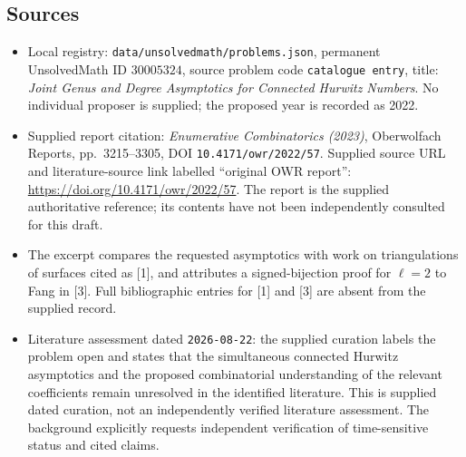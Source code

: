 \documentclass[11pt]{article}
\begin{document}
\subsection{Sources}
\begin{itemize}
\item Local registry: \texttt{data/unsolvedmath/problems.json}, permanent UnsolvedMath ID \(30005324\), source problem code \texttt{catalogue entry}, title: \emph{Joint Genus and Degree Asymptotics for Connected Hurwitz Numbers}. No individual proposer is supplied; the proposed year is recorded as 2022.
\item Supplied report citation: \emph{Enumerative Combinatorics (2023)}, Oberwolfach Reports, pp.\ 3215--3305, DOI \texttt{10.4171/owr/2022/57}. Supplied source URL and literature-source link labelled ``original OWR report'': \url{https://doi.org/10.4171/owr/2022/57}. The report is the supplied authoritative reference; its contents have not been independently consulted for this draft.
\item The excerpt compares the requested asymptotics with work on triangulations of surfaces cited as [1], and attributes a signed-bijection proof for \(\ell=2\) to Fang in [3]. Full bibliographic entries for [1] and [3] are absent from the supplied record.
\item Literature assessment dated \texttt{2026-08-22}: the supplied curation labels the problem open and states that the simultaneous connected Hurwitz asymptotics and the proposed combinatorial understanding of the relevant coefficients remain unresolved in the identified literature. This is supplied dated curation, not an independently verified literature assessment. The background explicitly requests independent verification of time-sensitive status and cited claims.
\end{itemize}
\end{document}
